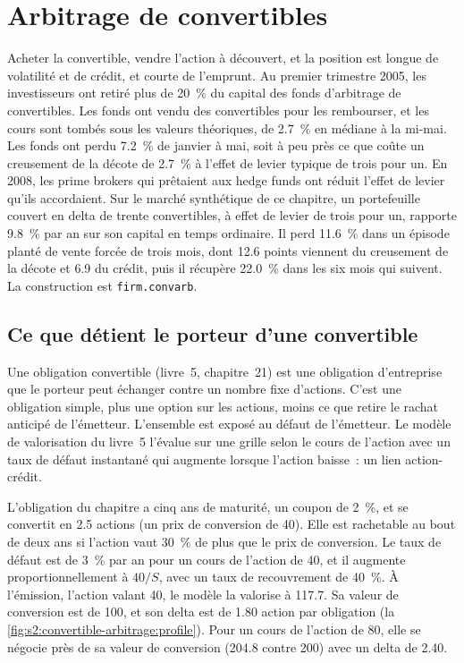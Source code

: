 \chapter{Arbitrage de convertibles}\label{ch:s2:convertible-arbitrage}

Acheter la convertible, vendre l'action à découvert, et la position est longue de volatilité et de crédit, et courte de l'emprunt. Au premier trimestre 2005, les investisseurs
ont retiré plus de 20~\% du capital des fonds d'arbitrage de convertibles. Les fonds ont vendu des convertibles pour les rembourser, et les cours sont tombés sous les
valeurs théoriques, de 2.7~\% en médiane à la mi-mai. Les fonds ont perdu 7.2~\% de janvier à mai, soit à peu près ce que coûte un creusement de la décote de 2.7~\% à l'effet de levier typique de trois
pour un. En 2008, les prime brokers qui prêtaient aux hedge funds ont réduit l'effet de levier qu'ils accordaient. Sur le marché synthétique de ce chapitre, un portefeuille couvert en delta de
trente convertibles, à effet de levier de trois pour un, rapporte 9.8~\% par an sur son capital en temps ordinaire. Il perd 11.6~\% dans un épisode planté de
vente forcée de trois mois, dont 12.6 points viennent du creusement de la décote et 6.9 du crédit, puis il récupère 22.0~\% dans les six mois qui suivent. La construction est
\texttt{firm.convarb}.

\section{Ce que détient le porteur d'une convertible}

Une obligation convertible (livre~5, chapitre~21) est une obligation d'entreprise que le porteur peut échanger contre un nombre fixe d'actions. C'est une obligation simple, plus une option
sur les actions, moins ce que retire le rachat anticipé de l'émetteur. L'ensemble est exposé au défaut de l'émetteur. Le modèle de valorisation du livre~5 l'évalue sur une grille selon le cours de l'action
avec un taux de défaut instantané qui augmente lorsque l'action baisse~: un lien action-crédit.

L'obligation du chapitre a cinq ans de maturité, un coupon de 2~\%, et se convertit en 2.5 actions (un prix de conversion de 40). Elle est rachetable au bout de deux ans si
l'action vaut 30~\% de plus que le prix de conversion. Le taux de défaut est de 3~\% par an pour un cours de l'action de 40, et il augmente proportionnellement à $40/S$, avec un taux de recouvrement de 40~\%. À
l'émission, l'action valant 40, le modèle la valorise à 117.7. Sa valeur de conversion est de 100, et son delta est de 1.80 action par obligation
(la \cref{fig:s2:convertible-arbitrage:profile}). Pour un cours de l'action de 80, elle se négocie près de sa valeur de conversion (204.8 contre 200) avec un delta de 2.40.

